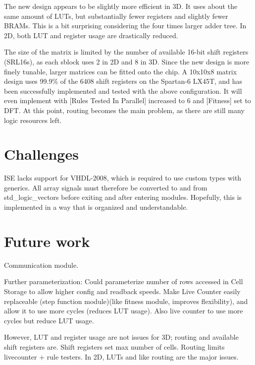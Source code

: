 The new design appears to be slightly more efficient in 3D.
It uses about the same amount of LUTs, but substantially fewer registers and slightly fewer BRAMs.
This is a bit surprising considering the four times larger adder tree.
In 2D, both LUT and register usage are drastically reduced.

The size of the matrix is limited by the number of available 16-bit shift registers (SRL16s), as each sblock uses 2 in 2D and 8 in 3D.
Since the new design is more finely tunable, larger matrices can be fitted onto the chip.
A 10x10x8 matrix design uses 99.9\% of the 6408 shift registers on the Spartan-6 LX45T, and has been successfully implemented and tested with the above configuration.
It will even implement with [Rules Tested In Parallel] increased to 6 and [Fitness] set to DFT.
At this point, routing becomes the main problem, as there are still many logic resources left.


\section{Challenges}
\label{sec:challenges}

\TODO

ISE lacks support for VHDL-2008, which is required to use custom types with generics.
All array signals must therefore be converted to and from std\_logic\_vectors before exiting and after entering modules.
Hopefully, this is implemented in a way that is organized and understandable.

\TODO


\section{Future work}

Communication module.

\TODO

Further parameterization:
Could parameterize number of rows accessed in Cell Storage to allow higher config and readback speeds.
Make Live Counter easily replaceable (step function module)(like fitness module, improves flexibility), and allow it to use more cycles (reduces LUT usage).
Also live counter to use more cycles but reduce LUT usage.

However, LUT and register usage are not issues for 3D; routing and available shift registers are.
Shift registers set max number of cells.
Routing limits livecounter + rule testers.
In 2D, LUTs and like routing are the major issues.

